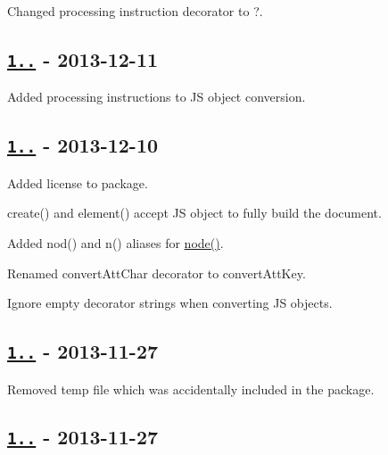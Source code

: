 \begin{DoxyItemize}
\item Changed processing instruction decorator to {\ttfamily ?}.
\end{DoxyItemize}

\subsection*{\href{https://github.com/oozcitak/xmlbuilder-js/compare/v1.1.0...v1.1.1}{\tt 1..} -\/ 2013-\/12-\/11}


\begin{DoxyItemize}
\item Added processing instructions to JS object conversion.
\end{DoxyItemize}

\subsection*{\href{https://github.com/oozcitak/xmlbuilder-js/compare/v1.0.2...v1.1.0}{\tt 1..} -\/ 2013-\/12-\/10}


\begin{DoxyItemize}
\item Added license to package.
\item {\ttfamily create()} and {\ttfamily element()} accept JS object to fully build the document.
\item Added {\ttfamily nod()} and {\ttfamily n()} aliases for {\ttfamily \mbox{\hyperlink{structnode}{node()}}}.
\item Renamed {\ttfamily convert\+Att\+Char} decorator to {\ttfamily convert\+Att\+Key}.
\item Ignore empty decorator strings when converting JS objects.
\end{DoxyItemize}

\subsection*{\href{https://github.com/oozcitak/xmlbuilder-js/compare/v1.0.1...v1.0.2}{\tt 1..} -\/ 2013-\/11-\/27}


\begin{DoxyItemize}
\item Removed temp file which was accidentally included in the package.
\end{DoxyItemize}

\subsection*{\href{https://github.com/oozcitak/xmlbuilder-js/compare/v1.0.0...v1.0.1}{\tt 1..} -\/ 2013-\/11-\/27}


